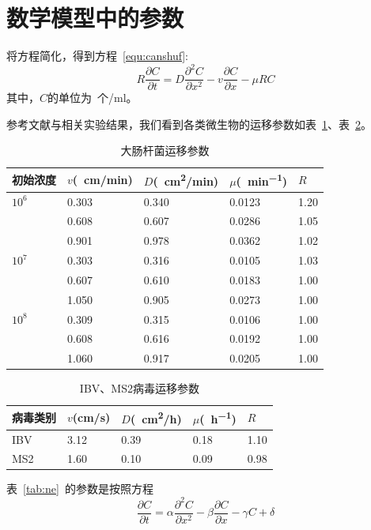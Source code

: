 \documentclass[a4paper,cs4size,adobefonts,fancyhdr]{ctexart}[2005/11/25]
\numberwithin{equation}{section} %
\begin{document}
\section{数学模型中的参数}
将方程简化，得到方程~\ref{equ:canshuf}:
\begin{equation}\label{equ:canshuf}
	R\dfrac{\partial C}{\partial t} = D\dfrac{\partial^2 C}{\partial x^2}-v\dfrac{\partial C}{\partial x}-\mu RC
\end{equation}
其中，$C$的单位为\SI{}{个/ml}。\par
参考文献与相关实验结果，我们看到各类微生物的运移参数如表~\ref{tab:dachangganjun}、表~\ref{tab:ibv}。
\begin{table}[!ht]
\caption{\label{tab:dachangganjun}大肠杆菌运移参数}
\centering
\begin{tabularx}{14cm}{XXXXX}
\toprule
初始浓度 & $v$(\SI{}{cm/min}) & $D$(\SI{}{cm^2/min}) & $\mu$(\SI{}{min^{-1}}) & $R$\\
\midrule
$10^6$	&	0.303	&	0.340	&	0.0123	&	1.20 \\
		&	0.608	&	0.607	&	0.0286	&	1.05 \\
		&	0.901	&	0.978	&	0.0362	&	1.02 \\
$10^7$	&	0.303	&	0.316	&	0.0105	&	1.03 \\
		&	0.607	&	0.610	&	0.0183	&	1.00 \\
		&	1.050	&	0.905	&	0.0273	&	1.00 \\
$10^8$	&	0.309	&	0.315	&	0.0106	&	1.00 \\
		&	0.608	&	0.616	&	0.0192	&	1.00 \\
		&	1.060	&	0.917	&	0.0205	&	1.00 \\
\bottomrule
\end{tabularx}
\end{table}
\par
\begin{table}[!ht]
\caption{\label{tab:ibv}IBV、MS2病毒运移参数}
\centering
\begin{tabularx}{14cm}{XXXXX}
\toprule
病毒类别 & $v$(cm/s) & $D$(\SI{}{cm^2/h}) & $\mu$(\SI{}{h^{-1}}) & $R$\\
\midrule
IBV		& 3.12	& 0.39	&	0.18	&	1.10	\\
MS2		& 1.60	& 0.10	&	0.09	&	0.98	\\
\bottomrule
\end{tabularx}
\end{table}
\par
表~\ref{tab:ne}~的参数是按照方程
\begin{equation}
	\dfrac{\partial C}{\partial t}= \alpha\dfrac{\partial^2 C}{\partial x^2}-\beta\dfrac{\partial C}{\partial x}-\gamma C + \delta
\end{equation}
\end{document}
